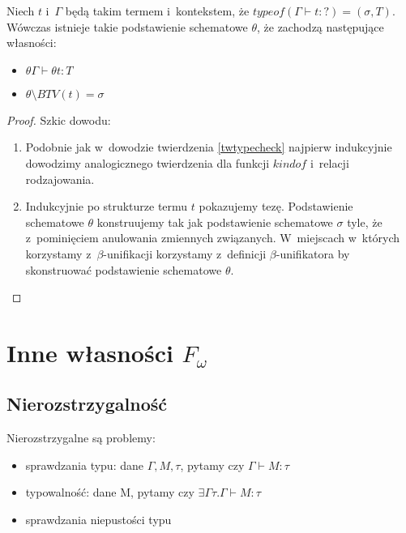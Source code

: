 \documentclass[11pt,leqno]{article}
\begin{document}
\begin{twierdzenie}
Niech $t$ i~$\Gamma$ będą takim termem i~kontekstem, że $typeof(\Gamma \vdash t : ?) = (\sigma, T)$. Wówczas
istnieje takie podstawienie schematowe $\theta$, że zachodzą następujące własności:
\begin{itemize}
\item $\theta \Gamma \vdash \theta t : T$
\item $\theta \setminus BTV(t) = \sigma$
\end{itemize}
\end{twierdzenie}
\begin{proof}
Szkic dowodu:
\begin{enumerate}
\item Podobnie jak w~dowodzie twierdzenia \ref{twtypecheck} najpierw indukcyjnie dowodzimy analogicznego twierdzenia
dla funkcji $kindof$ i~relacji rodzajowania.
\item Indukcyjnie po strukturze termu $t$ pokazujemy tezę. Podstawienie schematowe $\theta$ konstruujemy tak jak podstawienie schematowe
$\sigma$ tyle, że z~pominięciem anulowania zmiennych związanych. W~miejscach w~których korzystamy z~$\beta$-unifikacji
korzystamy z~definicji \mbox{$\beta$-unifikatora} by skonstruować podstawienie schematowe $\theta$.
\end{enumerate}
\end{proof}


\section{Inne własności $F_\omega$}
\setcounter{equation}{0}

\subsection{Nierozstrzygalność}

\begin{fakt}
Nierozstrzygalne są problemy:
    \begin{itemize}
        \item sprawdzania typu: dane $\Gamma, M, \tau$, pytamy czy $\Gamma \vdash M : \tau$
        \item typowalność: dane M, pytamy czy $\exists \Gamma \tau . \Gamma \vdash M : \tau$
        \item sprawdzania niepustości typu 
    \end{itemize}
\end{fakt}
\end{document}
